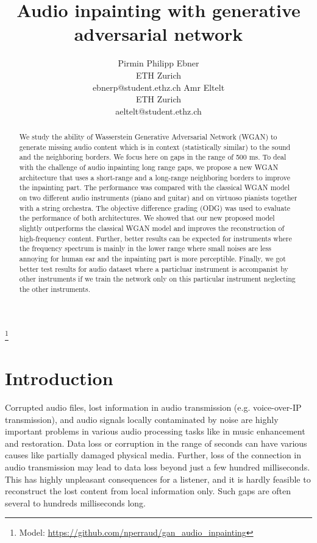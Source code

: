 \documentclass{article} %
\title{Audio inpainting with generative adversarial network}
\author{
Pirmin Philipp Ebner\\
ETH Zurich
\\
ebnerp@student.ethz.ch
\And
Amr Eltelt\\
ETH Zurich\\
aeltelt@student.ethz.ch
}
\begin{document}
\maketitle

\begin{abstract}
We study the ability of Wasserstein Generative Adversarial Network (WGAN) to generate missing audio content which is in context (statistically similar) to the sound and the neighboring borders. We focus here on gaps in the range of 500 ms. To deal with the challenge of audio inpainting long range gaps, we propose a new WGAN architecture that uses a short-range and a long-range neighboring borders to improve the inpainting part. The performance was compared with the classical WGAN model on two different audio instruments (piano and guitar) and on virtuoso pianists together with a string orchestra. The objective difference grading (ODG) was used to evaluate the performance of both architectures. We showed that our new proposed model slightly outperforms the classical WGAN model and improves the reconstruction of high-frequency content. Further, better results can be expected for instruments where the frequency spectrum is mainly in the lower range where small noises are less annoying for human ear and the inpainting part is more perceptible. Finally, we got better test results for audio dataset where a particluar instrument is accompanist by other instruments if we train the network only on this particular instrument neglecting the other instruments. 

\end{abstract}
\let\thefootnote\relax\footnote{Model: \url{https://github.com/nperraud/gan_audio_inpainting}}
\section{Introduction}
Corrupted audio files, lost information in audio transmission (e.g. voice-over-IP transmission), and audio signals locally contaminated by noise are highly important problems in various audio processing tasks like in music enhancement and restoration. Data loss or corruption in the range of seconds can have various causes like partially damaged physical media. Further, loss of the connection in audio transmission may lead to data loss beyond just a few hundred milliseconds. This has highly unpleasant consequences for a listener, and it is hardly feasible to reconstruct the lost content from local information only. Such gaps are often several to hundreds milliseconds long.
\end{document}
